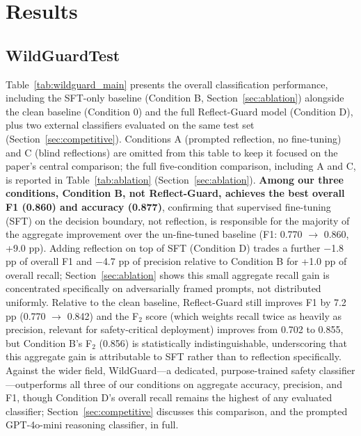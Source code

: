 \documentclass[superintelligence,article,accept,moreauthors]{Definitions/mdpi}
\renewcommand{\highlighting}[1]{#1}
\begin{document}
\section{\highlighting{Results} %
}
\label{sec:results}

\subsection{WildGuardTest}

Table~\ref{tab:wildguard_main} presents the overall classification performance, including the SFT-only baseline (Condition B, Section~\ref{sec:ablation}) alongside the clean baseline (Condition 0) and the full Reflect-Guard model (Condition D), plus two external classifiers evaluated on the same test set (Section~\ref{sec:competitive}). Conditions A (prompted reflection, no fine-tuning) and C (blind reflections) are omitted from this table to keep it focused on the paper's central comparison; the full five-condition comparison, including A and C, is reported in Table~\ref{tab:ablation} (Section~\ref{sec:ablation}). \textbf{Among our three conditions, Condition B, not Reflect-Guard, achieves the best overall F1 (0.860) and accuracy (0.877)}, confirming that supervised fine-tuning (SFT) on the decision boundary, not reflection, is responsible for the majority of the aggregate improvement over the un-fine-tuned baseline (F1: 0.770 $\to$ 0.860, +9.0 pp). Adding reflection on top of SFT (Condition D) trades a further $-$1.8 pp of overall F1 and $-$4.7 pp of precision relative to Condition B for +1.0 pp of overall recall; Section~\ref{sec:ablation} shows this small aggregate recall gain is concentrated specifically on adversarially framed prompts, not distributed uniformly. Relative to the clean baseline, Reflect-Guard still improves F1 by 7.2 pp (0.770 $\to$ 0.842) and the F$_2$ score (which weights recall twice as heavily as precision, relevant for safety-critical deployment) improves from 0.702 to 0.855, but Condition B's F$_2$ (0.856) is statistically indistinguishable, underscoring that this aggregate gain is attributable to SFT rather than to reflection specifically. Against the wider field, WildGuard---a dedicated, purpose-trained safety classifier---outperforms all three of our conditions on aggregate accuracy, precision, and F1, though Condition D's overall recall remains the highest of any evaluated classifier; Section~\ref{sec:competitive} discusses this comparison, and the prompted GPT-4o-mini reasoning classifier, in full.
\end{document}
